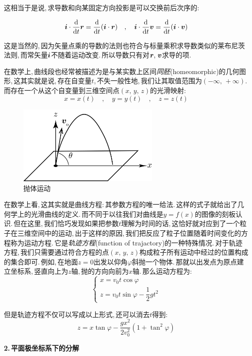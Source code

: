 这相当于是说,\,求导数和向某固定方向投影是可以交换前后次序的:

\[\boldsymbol{i}\cdot \frac{\textrm{d} }{\textrm{d} t}\boldsymbol{r}=\frac{\textrm{d} }{\textrm{d} t}(\boldsymbol{i}\cdot \boldsymbol{r})\quad,\quad \boldsymbol{i}\cdot \frac{\textrm{d} }{\textrm{d} t}\boldsymbol{v}=\frac{\textrm{d} }{\textrm{d} t}(\boldsymbol{i}\cdot \boldsymbol{v})\]

这是当然的,\,因为矢量点乘的导数的法则也符合与标量乘积求导数类似的莱布尼茨法则,\,而常矢量$\boldsymbol{i}$不随着运动改变.\,所以导数只有对$\boldsymbol{r},\,\boldsymbol{v}$求导的项.

在数学上,\,曲线段也经常被描述为是与某实数上区间\emph{同胚}(homeomorphic)的几何图形,\,这其实就是说,\,存在自变量$t$,\,不失一般性地,\,我们让其取值范围为$(-\infty,\,+\infty)$.\,而存在一个从这个自变量到三维空间点$(x,\,y,\,z)$的光滑映射:
\[x=x(t)\quad ,\quad y=y(t)\quad ,\quad z=z(t)\]

\begin{figure}\label{6-1-4}
\vspace{-0.4cm}
\centering
\includegraphics[width=7cm]{image/6-1-4.png}
\caption{抛体运动}
\end{figure}
在数学上看,\,这其实就是曲线方程:\,其参数方程的唯一给法.\,这样的式子就给出了几何学上的光滑曲线的定义.\,而不同于以往我们对曲线是$y=f(x)$的图像的刻板认识.\,但在这里,\,我们恰巧发现如果把参数$t$理解为时间的话,\,这恰好就对应到了一个粒子在三维空间中的运动,\,出于这样的原因,\,我们把反应了粒子位置随着时间变化的方程称为运动方程.\,它是\emph{轨迹方程}(function of trajactory)的一种特殊情况.\,对于轨迹方程,\,我们只需要通过符合方程的点$(x,\,y,\,z)$构成粒子所有运动中经过的位置构成的集合即可.\,例如,\,在地面$z=0$出发以仰角$\varphi$斜抛一个物体.\,那就以出发点为原点建立坐标系,\,竖直向上为$z$轴,\,抛的方向向前为$x$轴.\,那么运动方程为:
\[\left\{\begin{array}{l} x=v_0 t\cos\varphi\\ z=v_0 t\sin\varphi - \dfrac{1}{2}gt^2\end{array}\right.\]

但是轨迹方程不仅可以写成以上形式,\,还可以消去$t$得到:
\[z=x\tan\varphi -\frac{gx^2}{2v_0^2}(1+\tan^2\varphi)\]

\vspace{0.2cm}
{\bf 2.\,平面极坐标系下的分解}

